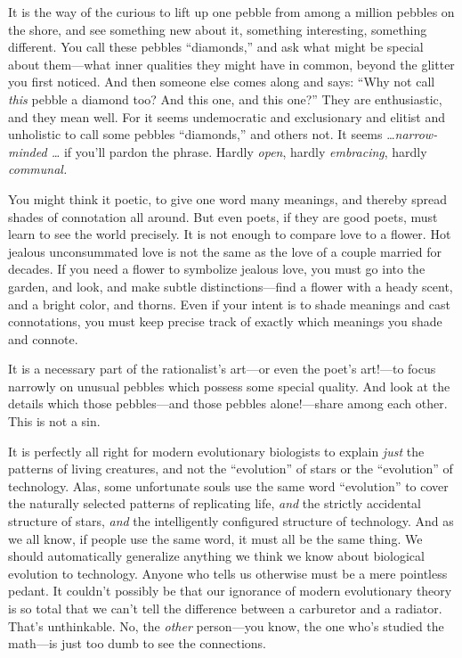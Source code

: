 {
 It is the way of the curious to lift up one pebble from among a
million pebbles on the shore, and see something new about it, something
interesting, something different. You call these pebbles
``diamonds,'' and ask what might be
special about them---what inner qualities they might have in common,
beyond the glitter you first noticed. And then someone else comes along
and says: ``Why not call \textit{this} pebble a
diamond too? And this one, and this one?'' They are
enthusiastic, and they mean well. For it seems undemocratic and
exclusionary and elitist and unholistic to call some pebbles
``diamonds,'' and others not. It
seems \ldots \textit{narrow-minded \ldots} if you'll
pardon the phrase. Hardly \textit{open}, hardly \textit{embracing},
hardly \textit{communal.}}

{
 You might think it poetic, to give one word many meanings, and
thereby spread shades of connotation all around. But even poets, if
they are good poets, must learn to see the world precisely. It is not
enough to compare love to a flower. Hot jealous unconsummated love is
not the same as the love of a couple married for decades. If you need a
flower to symbolize jealous love, you must go into the garden, and
look, and make subtle distinctions---find a flower with a heady scent,
and a bright color, and thorns. Even if your intent is to shade
meanings and cast connotations, you must keep precise track of exactly
which meanings you shade and connote.}

{
 It is a necessary part of the rationalist's
art---or even the poet's art!---to focus narrowly on
unusual pebbles which possess some special quality. And look at the
details which those pebbles---and those pebbles alone!---share among
each other. This is not a sin.}

{
 It is perfectly all right for modern evolutionary biologists to
explain \textit{just} the patterns of living creatures, and not the
``evolution'' of stars or the
``evolution'' of technology. Alas,
some unfortunate souls use the same word
``evolution'' to cover the naturally
selected patterns of replicating life, \textit{and} the strictly
accidental structure of stars, \textit{and} the intelligently
configured structure of technology. And as we all know, if people use
the same word, it must all be the same thing. We should automatically
generalize anything we think we know about biological evolution to
technology. Anyone who tells us otherwise must be a mere pointless
pedant. It couldn't possibly be that our ignorance of
modern evolutionary theory is so total that we can't
tell the difference between a carburetor and a radiator.
That's unthinkable. No, the \textit{other} person---you
know, the one who's studied the math---is just too dumb
to see the connections.}

